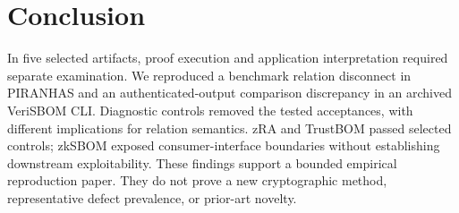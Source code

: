 \documentclass[sigconf,nonacm]{acmart}
\begin{document}
\section{Conclusion}
In five selected artifacts, proof execution and application interpretation required separate examination. We reproduced a benchmark relation disconnect in PIRANHAS and an authenticated-output comparison discrepancy in an archived VeriSBOM CLI. Diagnostic controls removed the tested acceptances, with different implications for relation semantics. zRA and TrustBOM passed selected controls; zkSBOM exposed consumer-interface boundaries without establishing downstream exploitability. These findings support a bounded empirical reproduction paper. They do not prove a new cryptographic method, representative defect prevalence, or prior-art novelty.
\end{document}
